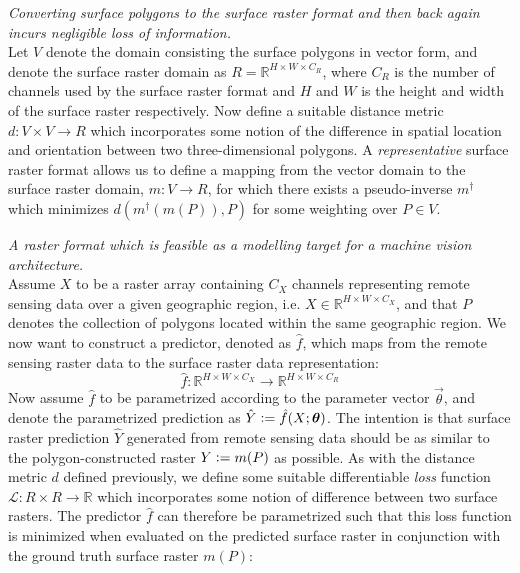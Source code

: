 \begin{description}[style=nextline]
  \item[Representative]
    \textit{Converting surface polygons to the surface raster format and then back again incurs negligible loss of information.}
    \\
    Let $V$ denote the domain consisting the surface polygons in vector form, and denote the surface raster domain as $R = \mathbb{R}^{H \times W \times C_R}$, where $C_R$ is the number of channels used by the surface raster format and $H$ and $W$ is the height and width of the surface raster respectively.
    Now define a suitable distance metric $d: V \times V \rightarrow{R}$ which incorporates some notion of the difference in spatial location and orientation between two three-dimensional polygons.
    A \textit{representative} surface raster format allows us to define a mapping from the vector domain to the surface raster domain, $m: V \rightarrow R$, for which there exists a pseudo-inverse $m^{\dagger}$ which minimizes $d(m^{\dagger}(m(P)), P)$ for some weighting over $P \in V$.
  \item[Targetable] 
    \textit{A raster format which is feasible as a modelling target for a machine vision architecture.}
    \\
    Assume $X$ to be a raster array containing $C_X$ channels representing remote sensing data over a given geographic region, i.e. $X \in \mathbb{R}^{H \times W \times C_X}$, and that $P$ denotes the collection of polygons located within the same geographic region.
    We now want to construct a predictor, denoted as $\hat{f}$, which maps from the remote sensing raster data to the surface raster data representation:
    \begin{equation*}
      \hat{f}:
        \mathbb{R}^{H \times W \times C_X}
        \rightarrow
        \mathbb{R}^{H \times W \times C_R}
    \end{equation*}
    Now assume $\hat{f}$ to be parametrized according to the parameter vector $\vec{\theta}$, and denote the parametrized prediction as $\hat{Y} \vcentcolon= \hat{f}(X; \boldsymbol{\theta})$.
    The intention is that surface raster prediction $\hat{Y}$ generated from remote sensing data should be as similar to the polygon-constructed raster $Y \vcentcolon= m(P)$ as possible.
    As with the distance metric $d$ defined previously, we define some suitable differentiable \textit{loss} function $\mathcal{L}: R \times R \rightarrow \mathbb{R}$ which incorporates some notion of difference between two surface rasters.
    The predictor $\hat{f}$ can therefore be parametrized such that this loss function is minimized when evaluated on the predicted surface raster in conjunction with the ground truth surface raster $m(P)$:

\end{description}
